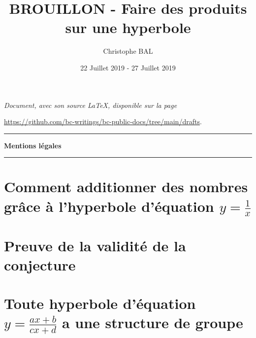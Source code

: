 \documentclass[12pt]{amsart}
\begin{document}
\title{BROUILLON - Faire des produits sur une hyperbole}
\author{Christophe BAL}
\date{22 Juillet 2019 - 27 Juillet 2019}
\maketitle


\begin{center}
	\itshape
	Document, avec son source \LaTeX, disponible sur la page

	\url{https://github.com/bc-writings/bc-public-docs/tree/main/drafts}.
\end{center}


\bigskip


\begin{center}
	\hrule\vspace{.3em}
	{
		\fontsize{1.35em}{1em}\selectfont
		\textbf{Mentions \og légales \fg}
	}

	\vspace{0.45em}
	\doclicenseThis
	\hrule
\end{center}



\setcounter{tocdepth}{2}
\tableofcontents




\newpage

\section{\texorpdfstring{Comment additionner des nombres grâce à l'hyperbole d'équation $y = \frac{1}{x}$}%
                        {Comment additionner des nombres grâce à l'hyperbole d'équation y = 1/x}}





\section{Preuve de la validité de la conjecture} \label{proof}





\section{\texorpdfstring{Toute hyperbole d'équation $y = \frac{a x + b}{c x + d}$ a une structure de groupe}%
                        {Toute hyperbole d'équation y = (a x + b) / (c x + d) a une structure de groupe}}





\end{document}
